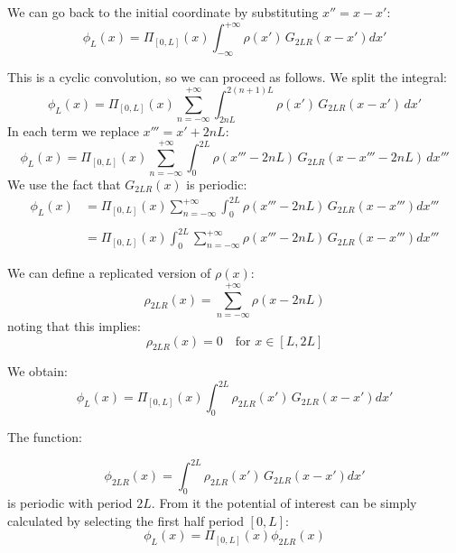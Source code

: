 We can go back to the initial coordinate by substituting $x'' = x-x'$:
\begin{equation}
\phi_L(x) = 
\Pi_{[0,L]}\left(x\right)
\int_{-\infty}^{+\infty} 
\rho(x')\,G_{2LR}(x-x') dx'
\end{equation}

This is a cyclic convolution, so we can proceed as follows. We split the integral:
\begin{equation}
\phi_L(x) = 
\Pi_{[0,L]}\left({x}\right)
\sum_{n=-\infty}^{+\infty}
\int_{2nL}^{2(n+1)L} 
\rho(x')\,G_{2LR}(x-x') \,dx'
\label{eq:conv3}
\end{equation}
In each term we replace $x''' = x'+2nL$:
\begin{equation}
\phi_L(x) = 
\Pi_{[0,L]}\left({x}\right)
\sum_{n=-\infty}^{+\infty}
\int_{0 }^{2L} 
\rho(x'''-2nL)\,G_{2LR}(x-x'''-2nL) \,dx'''
\label{eq:conv4}
\end{equation}
We use the fact that $G_{2LR}(x)$ is periodic:
\begin{equation}
\begin{split}
\phi_L(x) &= 
\Pi_{[0,L]}\left({x}\right)
\sum_{n=-\infty}^{+\infty}
\int_{0 }^{2L} 
\rho(x'''-2nL)\,G_{2LR}(x-x''') dx'''\\
\\&=
\Pi_{[0,L]}\left({x}\right)
\int_{0 }^{2L}  
\sum_{n=-\infty}^{+\infty}
\rho(x'''-2nL)\,G_{2LR}(x-x''') dx'''
\end{split}
\label{eq:conv5}
\end{equation}

We can define a replicated version of $\rho(x)$:
\begin{equation}
\rho_{2LR}(x)= \sum_{n=-\infty}^{+\infty}
\rho(x-2nL)
\end{equation}
noting that this implies:
\begin{equation}
\rho_{2LR}(x)= 0 \quad \text{for } x \in [L, 2L]
\label{eq:zeros}
\end{equation}

We obtain:
\begin{equation}
\phi_L(x) = 
\Pi_{[0,L]}\left({x}\right)
\int_{0 }^{2L} 
\rho_{2LR}(x')\,G_{2LR}(x-x') dx'
\label{eq:conv6}
\end{equation}

The function:

\begin{equation}
\phi_{2LR}(x) = 
\int_{0 }^{2L} 
\rho_{2LR}(x')\,G_{2LR}(x-x') dx'
\label{eq:confin}
\end{equation}
is periodic with period $2L$. From it the potential of interest can be simply calculated by selecting the first half period $[0, L]$:
\begin{equation}
\phi_L(x) = 
\Pi_{[0,L]}\left({x}\right)
\phi_{2LR}(x)
\label{eq:sel}
\end{equation}

